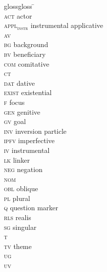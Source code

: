 \documentclass[output=paper,
,modfonts
,nonflat]{langsci/langscibook}
\begin{document}
\begin{multicols}{2}
	\begin{tabbing}
		glossgloss \= \kill
		\textsc{\sq} \> \\
		\textsc{act} \> actor\\
		\textsc{appl$_\text{instr}$} \> instrumental applicative\\
		\textsc{av} \> \\
		\textsc{bg} \> background\\
		\textsc{bv} \> beneficiary \\
		\textsc{com} \> comitative\\
		\textsc{ct} \> \\
		\textsc{dat} \> dative\\
		\textsc{exist} \> existential\\
		\textsc{f} \> focus\\
		\textsc{gen} \> genitive\\
		\textsc{gv} \> goal \\
		\textsc{inv} \> inversion particle\\
		\textsc{ipfv} \> imperfective\\
		\textsc{iv} \> instrumental \\
		\textsc{lk} \> linker\\
		\textsc{neg} \> negation\\
		\textsc{nom} \> \\
		\textsc{obl} \> oblique\\
		\textsc{pl} \> plural\\
		\textsc{q} \> question marker\\
		\textsc{rls} \> realis\\
		\textsc{sg} \> singular\\
		\textsc{t} \> \\
		\textsc{tv} \> theme \\
		\textsc{ug} \> \\
		\textsc{uv} \> 
	\end{tabbing}
\end{multicols}

\sloppy
\printbibliography[heading=subbibliography,notkeyword=this]
\end{document}
